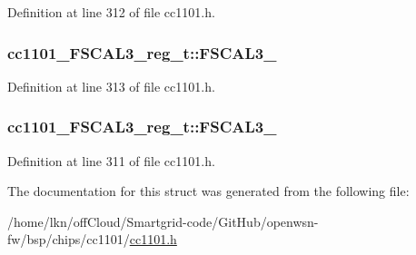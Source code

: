 Definition at line 312 of file cc1101.\+h.

\subsubsection[{\texorpdfstring{F\+S\+C\+A\+L3\+\_\+1}{FSCAL3_1}}]{ cc1101\+\_\+\+F\+S\+C\+A\+L3\+\_\+reg\+\_\+t\+::\+F\+S\+C\+A\+L3\+\_}\hypertarget{structcc1101___f_s_c_a_l3__reg__t_ad61ab1323bf574a06772443074e4c522}{}\label{structcc1101___f_s_c_a_l3__reg__t_ad61ab1323bf574a06772443074e4c522}


Definition at line 313 of file cc1101.\+h.

\subsubsection[{\texorpdfstring{F\+S\+C\+A\+L3\+\_\+2}{FSCAL3_2}}]{ cc1101\+\_\+\+F\+S\+C\+A\+L3\+\_\+reg\+\_\+t\+::\+F\+S\+C\+A\+L3\+\_}\hypertarget{structcc1101___f_s_c_a_l3__reg__t_ae1f17f678f2a671553decc429ce6b4ec}{}\label{structcc1101___f_s_c_a_l3__reg__t_ae1f17f678f2a671553decc429ce6b4ec}


Definition at line 311 of file cc1101.\+h.



The documentation for this struct was generated from the following file\+:\begin{DoxyCompactItemize}
\item 
/home/lkn/off\+Cloud/\+Smartgrid-\/code/\+Git\+Hub/openwsn-\/fw/bsp/chips/cc1101/\hyperlink{cc1101_8h}{cc1101.\+h}\end{DoxyCompactItemize}
